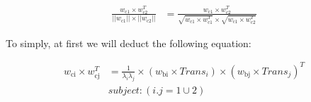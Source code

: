 \begin{equation} \label{30} 
\begin{split}
\frac{w_{\text{c1}} \times w_{\text{c2}}^T} {||w_{\text{c1}}|| \times ||w_{\text{c2}}|| } & =  \frac{w_{\text{c1}} \times w_{\text{c2}}^T} {\sqrt{w_{\text{c1}} \times w_{\text{c1}}^T} \times \sqrt{w_{\text{c1}} \times w_{\text{c2}}^T} }
\end{split}
\end{equation}

To simply, at first we will deduct the following equation:

\begin{equation} \label{31} 
\begin{split}
w_{\text{ci}} \times w_{\text{cj}}^T & = \frac{1}{{\lambda}_{i}{\lambda}_{j} } \times (w_{\text{bi}} \times Trans_{i}) \times (w_{\text{bj}} \times Trans_{j})^T \\
& subject : (i.j = 1 \cup 2)
\end{split}
\end{equation}

\fi




